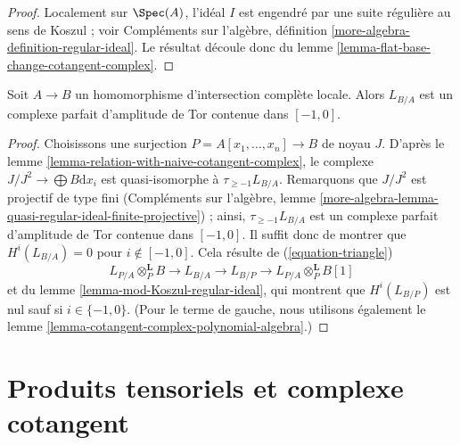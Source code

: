 \begin{proof}
Localement sur $\Spec(A)$, l'idéal $I$ est engendré par une suite régulière au
sens de Koszul ; voir Compléments sur l'algèbre, définition
\ref{more-algebra-definition-regular-ideal}. Le résultat découle donc du lemme
\ref{lemma-flat-base-change-cotangent-complex}.
\end{proof}

\begin{proposition}
\label{proposition-cotangent-complex-local-complete-intersection}
Soit $A \to B$ un homomorphisme d'intersection complète locale. Alors
$L_{B/A}$ est un complexe parfait d'amplitude de Tor contenue dans $[-1, 0]$.
\end{proposition}

\begin{proof}
Choisissons une surjection $P = A[x_1, \ldots, x_n] \to B$ de noyau $J$.
D'après le lemme \ref{lemma-relation-with-naive-cotangent-complex}, le
complexe $J/J^2 \to \bigoplus B\text{d}x_i$ est quasi-isomorphe à
$\tau_{\geq -1}L_{B/A}$. Remarquons que $J/J^2$ est projectif de type fini
(Compléments sur l'algèbre, lemme
\ref{more-algebra-lemma-quasi-regular-ideal-finite-projective}) ; ainsi,
$\tau_{\geq -1}L_{B/A}$ est un complexe parfait d'amplitude de Tor contenue
dans $[-1, 0]$. Il suffit donc de montrer que $H^i(L_{B/A}) = 0$ pour
$i \not \in [-1, 0]$. Cela résulte de (\ref{equation-triangle})
$$
L_{P/A} \otimes_P^\mathbf{L} B \to L_{B/A} \to L_{B/P} \to
L_{P/A} \otimes_P^\mathbf{L} B[1]
$$
et du lemme \ref{lemma-mod-Koszul-regular-ideal}, qui montrent que
$H^i(L_{B/P})$ est nul sauf si $i \in \{-1, 0\}$. (Pour le terme de gauche,
nous utilisons également le lemme
\ref{lemma-cotangent-complex-polynomial-algebra}.)
\end{proof}








\section{Produits tensoriels et complexe cotangent}
\label{section-tensor-product}

